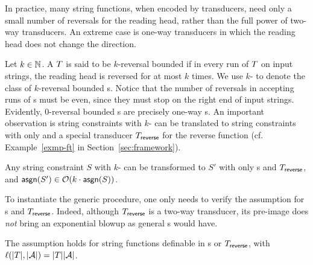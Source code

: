 In practice, many string functions, when encoded by transducers, need only a small number of reversals for the reading head, rather than the full power of two-way transducers. An extreme case is one-way transducers in which the reading head does not change the direction. 

%

 
Let $k \in \mathbb{N}$. A \PPT{} $T$ is said  to be $k$-reversal bounded if in every run of $T$ on input strings, the reading head is reversed for at most $k$ times. We use  $k$-\RBPPT{} to denote the class of $k$-reversal bounded \PPT{}s. Notice that the number of reversals in accepting runs of \PPT{}s must be even, since they must stop on the right end of input strings. Evidently, $0$-reversal bounded \PPT{}s are precisely one-way \PT{}s.   
%
%
An important observation is string constraints with $k$-\RBPPT{} can be translated to string constraints with only \PT{} and a special transducer $T_{\sf reverse}$ for the reverse function  (cf. Example~\ref{exmp-ft} in Section~\ref{sec:framework}).  

\begin{proposition} \label{prop:trans}
	Any string constraint $S$ with $k$-\RBPPT{} can be transformed to $S'$ with only \PT{}s and $T_{\sf reverse}$, and $ \mathsf{asgn}(S')\in \mathcal{O}(k\cdot \mathsf{asgn}(S))$. 
\end{proposition}

%
To instantiate the generic procedure, one only needs to verify the  \prerec{} assumption for \PT{}s and $T_{\sf reverse}$. Indeed, although $T_{\sf reverse}$ is a two-way transducer, its pre-image does \emph{not} bring an exponential blowup as general \PPT{}s would have. %

\begin{lemma}\label{lem-1pt}
	The \prerec{} assumption holds for string functions definable in \PT{}s or $T_{\sf reverse}$, with $\ell(|T|, |\mathcal{A}|) = |T||\mathcal{A}|$.
\end{lemma}

